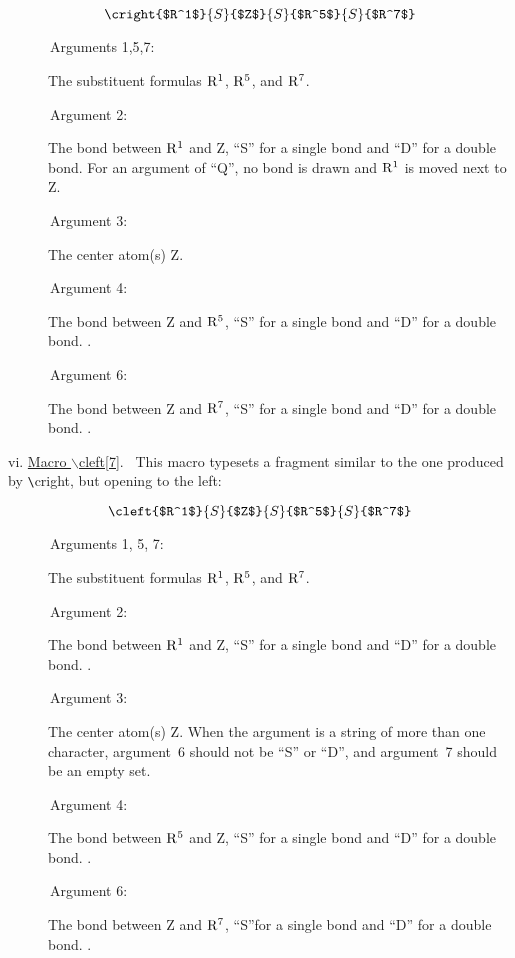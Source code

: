  \[ \cright{$R^1$}{S}{$Z$}{S}{$R^5$}{S}{$R^7$}  \]

 \begin{description}
 \item[{\rm \ \ \ \ \ \ Arguments 1,5,7:}] The substituent formulas
      ${\rm R^1}$, ${\rm R^5}$, and ${\rm R^7}$.
 \newpage
 \item[{\rm \ \ \ \ \ \ Argument 2:}] The bond between ${\rm R^1}$
      and Z, ``S'' for a single bond and ``D'' for a double
      bond. For an argument of ``Q'', no bond is drawn and
      ${\rm R^1}$ is moved next to Z.
 \item[{\rm \ \ \ \ \ \ Argument 3:}] The center atom(s) Z.
 \item[{\rm \ \ \ \ \ \ Argument 4:}] The bond between Z and 
      ${\rm R^5}$, ``S'' for a single bond and ``D'' for
      a double bond. \ri .
 \item[{\rm \ \ \ \ \ \ Argument 6:}] The bond between Z and ${\rm R^7}$,
      ``S'' for a single bond and ``D'' for a double bond. \ri .
 \end{description}

 \vspace{\len mm}
 \indent vi. \underline{Macro $\backslash $cleft[7]}.
  \ This macro typesets a fragment similar to the one produced
 by \verb+\+cright, but opening to the left:
 
 \[ \cleft{$R^1$}{S}{$Z$}{S}{$R^5$}{S}{$R^7$}  \]

 \begin{description}
 \item[{\rm \ \ \ \ \ \ Arguments 1, 5, 7:}] The substituent formulas
      ${\rm R^1}$, ${\rm R^5}$, and ${\rm R^7}$.
 \item[{\rm \ \ \ \ \ \ Argument 2:}] The bond between ${\rm R^1}$
      and Z, ``S'' for a single bond and ``D'' for a double
      bond. \ri .
 \item[{\rm \ \ \ \ \ \ Argument 3:}] The center atom(s) Z.
      When the argument is a string of more than one character,
      argument~6 should not be ``S'' or ``D'', and argument~7
      should be an empty set.
 \item[{\rm \ \ \ \ \ \ Argument 4:}] The bond between ${\rm R^5}$     
      and Z, ``S'' for a single bond and ``D'' for a double
      bond. \ri .
 \item[{\rm \ \ \ \ \ \ Argument 6:}] The bond between Z and
      ${\rm R^7}$, ``S''for a single bond and ``D'' for a
      double bond. \ri .
 \end{description}

